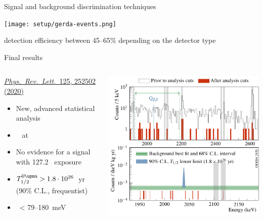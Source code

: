 \documentclass[10pt,aspectratio=169]{beamer}
\begin{document}
\begin{frame}{Signal and background discrimination techniques}
  \begin{center}
    \texttt{[image: setup/gerda-events.png]}
  \end{center}
  \begin{simpleblock}
    \begin{center}
      \alert{\onbb} detection \alert{efficiency} between \alert{45--65\%}
      depending on the detector type
    \end{center}
  \end{simpleblock}
\end{frame}
\begin{frame}{Final results}
  \begin{columns}
    \begin{column}{0.45\textwidth}
      \begin{simpleblock}
        \href{https://doi.org/10.1103/PhysRevLett.125.252502}{\emph{Phys.~Rev.~Lett.}~125, 252502 (2020)}
      \end{simpleblock}
      \begin{itemize}
        \item New, advanced statistical analysis
        \item \alert{~} at \qbb
        \item No evidence for a signal with \alert{127.2~\kgyr} exposure
        \item \alert{$\thalfzeroM > \thalfzerolimit$~yr} (90\% C.L., frequentist)
        \item \mbb\ < 79--180~meV
      \end{itemize}
    \end{column}
    \begin{column}{0.55\textwidth}
      \begin{center}
        \includegraphics[width=\columnwidth]{plots/G2006_spectr_prl_2.pdf}
      \end{center}
    \end{column}
  \end{columns}
\end{frame}
\end{document}
